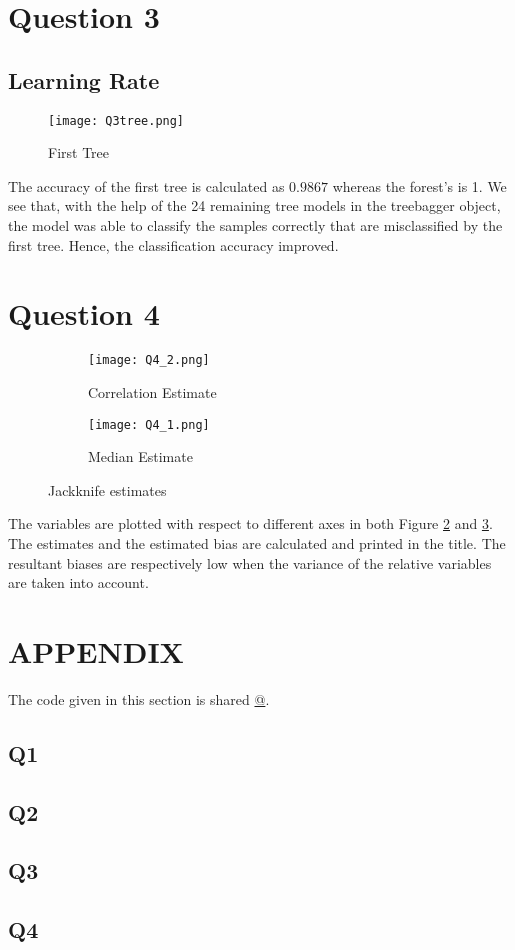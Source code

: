 \documentclass[11pt]{extarticle}
\begin{document}
\section{Question 3}
\subsection{Learning Rate}
\begin{figure}[h]
    \centering
    {\texttt{[image: Q3tree.png]}}
    \caption{First Tree}
    \label{fig:q3_tr}
\end{figure}

The accuracy of the first tree is calculated as $0.9867$ whereas the forest's is 1. We see that, with the help of the 24 remaining tree models in the treebagger object, the model was able to classify the samples correctly that are misclassified by the first tree. Hence, the classification accuracy improved. 

\section{Question 4}


\begin{figure}[h]
    \centering
    \begin{subfigure}{4cm}
        \texttt{[image: Q4\_2.png]}
        \caption{Correlation Estimate}\label{fig:q4a}
    \end{subfigure}
    \qquad
    \begin{subfigure}{4cm}
        \texttt{[image: Q4\_1.png]}
        \caption{Median Estimate}\label{fig:q4b}
    \end{subfigure}
    \caption{Jackknife estimates}%
    \label{fig:q4}%
\end{figure}

The variables are plotted with respect to different axes in both Figure \ref{fig:q4a} and \ref{fig:q4b}. The estimates and the estimated bias are calculated and printed in the title. The resultant biases are respectively low when the variance of the relative variables are taken into account.

\pagebreak
\section{APPENDIX}
The code given in this section is shared \href{https://github.com/kutay-ugurlu/Pattern-Recognition/tree/master/HW5}{@\faGithubSquare}.
\subsection{Q1}\label{subsec:Q1_code}

\pagebreak
\subsection{Q2} \label{subsec:Q2_code}

\pagebreak
\subsection{Q3}\label{subsec:Q3_code}

\pagebreak
\subsection{Q4}\label{subsec:Q4_code}

\end{document}
